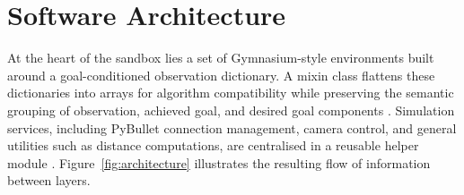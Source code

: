 \documentclass[11pt]{article}
\newcommand{\code}[1]{\texttt{\footnotesize\path{#1}}} %
\begin{document}
\section{Software Architecture}
At the heart of the sandbox lies a set of Gymnasium-style environments built around a goal-conditioned observation dictionary. A mixin class flattens these dictionaries into arrays for algorithm compatibility while preserving the semantic grouping of observation, achieved goal, and desired goal components \cite{goalMixin}. Simulation services, including PyBullet connection management, camera control, and general utilities such as distance computations, are centralised in a reusable helper module \cite{utilModule}. Figure~\ref{fig:architecture} illustrates the resulting flow of information between layers.

\begin{figure}[!t]
    \centering
\end{figure}
\end{document}
